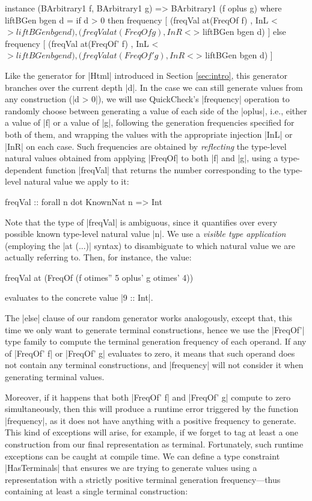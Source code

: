\begin{code}
instance (BArbitrary1 f, BArbitrary1 g)
  => BArbitrary1 (f oplus g) where
  liftBGen bgen d =
    if d > 0
    then frequency
      [ (freqVal  at(FreqOf f) ,  InL <$> liftBGen bgen d)
      , (freqVal  at(FreqOf g) ,  InR <$> liftBGen bgen d) ]
    else frequency
      [ (freqVal  at(FreqOf' f) ,  InL <$> liftBGen bgen d)
      , (freqVal  at(FreqOf' g) ,  InR <$> liftBGen bgen d) ]
\end{code}
%
Like the generator for |Html| introduced in Section \ref{sec:intro}, this
generator branches over the current depth |d|.
%
In the case we can still generate values from any construction (|d > 0|), we
will use QuickCheck's |frequency| operation to randomly choose between
generating a value of each side of the |oplus|, i.e., either a value of |f| or a
value of |g|, following the generation frequencies specified for both of them,
and wrapping the values with the appropriate injection |InL| or |InR| on each
case.
%
Such frequencies are obtained by \emph{reflecting} the type-level natural values
obtained from applying |FreqOf| to both |f| and |g|, using a type-dependent
function |freqVal| that returns the number corresponding to the type-level
natural value we apply to it:

\begin{code}
freqVal :: forall n dot KnownNat n => Int
\end{code}
%
Note that the type of |freqVal| is ambiguous, since it quantifies over every
possible known type-level natural value |n|.
%
We use a \emph{visible type application} \cite{eisenberg2016visible} (employing
the |at (...)| syntax) to disambiguate to which natural value we are actually
referring to.
%
Then, for instance, the value:

\begin{code}
  freqVal at (FreqOf (f otimes'' 5 oplus' g otimes' 4))
\end{code}
%
evaluates to the concrete value |9 :: Int|.


The |else| clause of our random generator works analogously, except that, this
time we only want to generate terminal constructions, hence we use the |FreqOf'|
type family to compute the terminal generation frequency of each operand.
%
If any of |FreqOf' f| or |FreqOf' g| evaluates to zero, it means that such
operand does not contain any terminal constructions, and |frequency| will not
consider it when generating terminal values.


Moreover, if it happens that both |FreqOf' f| and |FreqOf' g| compute to zero
simultaneously, then this will produce a runtime error triggered by the function
|frequency|, as it does not have anything with a positive frequency to generate.
%
This kind of exceptions will arise, for example, if we forget to tag at least a
one construction from our final representation as terminal.
%
Fortunately, such runtime exceptions can be caught at compile time.
%
We can define a type constraint |HasTerminals| that ensures we are trying to
generate values using a representation with a strictly positive terminal
generation frequency---thus containing at least a single terminal construction:

